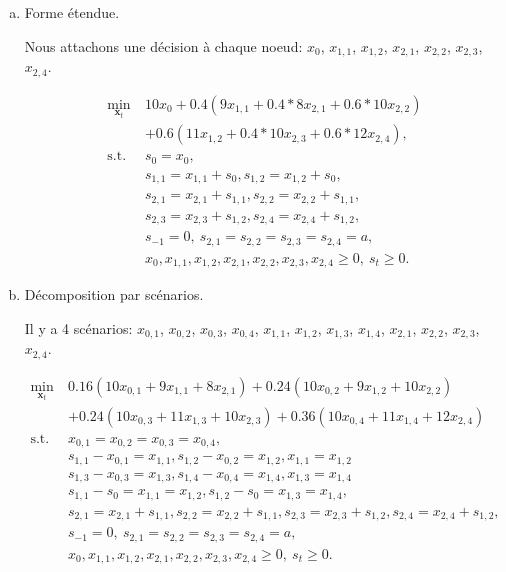 \documentclass[12pt]{book}
\def\bx {\boldsymbol{x}}
\begin{document}
\begin{enumerate}
\begin{enumerate}[a)]
\item
Forme étendue.

Nous attachons une décision à chaque noeud: $x_{0}$, $x_{1,1}$, $x_{1,2}$, $x_{2,1}$, $x_{2,2}$, $x_{2,3}$, $x_{2,4}$.

\begin{align*}
\min_{\bx_t}\ & 10x_0+0.4(9x_{1,1}+0.4*8x_{2,1}+0.6*10x_{2,2}) \\
& +0.6(11x_{1,2}+0.4*10x_{2,3}+0.6*12x_{2,4}),\\
\mbox{s.t. } & s_0 = x_0, \\
& s_{1,1} = x_{1,1}+s_0, s_{1,2} = x_{1,2}+s_0, \\
& s_{2,1} = x_{2,1}+s_{1,1}, s_{2,2} = x_{2,2}+s_{1,1}, \\
& s_{2,3} = x_{2,3}+s_{1,2}, s_{2,4} = x_{2,4}+s_{1,2}, \\
& s_{-1} = {0},\ s_{2,1} = s_{2,2} = s_{2,3} = s_{2,4} = a,\\
& x_0, x_{1,1}, x_{1,2}, x_{2,1}, x_{2,2}, x_{2,3}, x_{2,4} \geq 0,\ s_t \geq 0.
\end{align*}
\item
Décomposition par scénarios.

Il y a 4 scénarios: $x_{0,1}$, $x_{0,2}$, $x_{0,3}$, $x_{0,4}$,
$x_{1,1}$, $x_{1,2}$, $x_{1,3}$, $x_{1,4}$,
$x_{2,1}$, $x_{2,2}$, $x_{2,3}$, $x_{2,4}$.

\begin{align*}
\min_{\bx_t}\ &
0.16(10x_{0,1} + 9x_{1,1} + 8x_{2,1})
+ 0.24(10x_{0,2} + 9x_{1,2} + 10x_{2,2}) \\
& + 0.24(10x_{0,3} + 11x_{1,3} + 10x_{2,3})
+0.36(10x_{0,4} + 11x_{1,4} + 12x_{2,4}) \\
\mbox{s.t. } & x_{0,1} = x_{0,2} = x_{0,3} = x_{0,4}, \\
& s_{1,1} - x_{0,1} = x_{1,1},
s_{1,2} - x_{0,2} = x_{1,2},
x_{1,1} = x_{1,2} \\
& s_{1,3} - x_{0,3} = x_{1,3},
s_{1,4} - x_{0,4} = x_{1,4},
x_{1,3} = x_{1,4} \\
& s_{1,1} - s_0 = x_{1,1} = x_{1,2},
s_{1,2} - s_0 = x_{1,3} = x_{1,4}, \\
& s_{2,1} = x_{2,1}+s_{1,1}, s_{2,2} = x_{2,2}+s_{1,1},
 s_{2,3} = x_{2,3}+s_{1,2}, s_{2,4} = x_{2,4}+s_{1,2}, \\
& s_{-1} = {0},\ s_{2,1} = s_{2,2} = s_{2,3} = s_{2,4} = a,\\
& x_0, x_{1,1}, x_{1,2}, x_{2,1}, x_{2,2}, x_{2,3}, x_{2,4} \geq 0,\ s_t \geq 0.
\end{align*}
\end{enumerate}


\end{enumerate}
\end{document}
